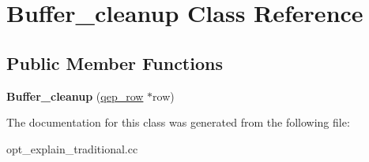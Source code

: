 \hypertarget{classBuffer__cleanup}{}\section{Buffer\+\_\+cleanup Class Reference}
\label{classBuffer__cleanup}
\subsection*{Public Member Functions}
\begin{DoxyCompactItemize}
\item 
\mbox{\label{classBuffer__cleanup_a4a8ce15c8c8e1857c3f3a27e0917f376}} 
{\bfseries Buffer\+\_\+cleanup} (\mbox{\hyperlink{classqep__row}{qep\+\_\+row}} $\ast$row)
\end{DoxyCompactItemize}


The documentation for this class was generated from the following file\+:\begin{DoxyCompactItemize}
\item 
opt\+\_\+explain\+\_\+traditional.\+cc\end{DoxyCompactItemize}

